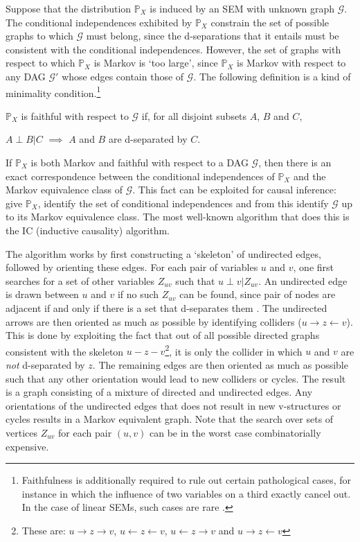 Suppose that the distribution $\mathbb{P}_X$ is induced by an SEM with unknown graph $\mathcal{G}$.
The conditional independences exhibited by $\mathbb{P}_X$ constrain the set of possible graphs to which $\mathcal{G}$ must belong, since the d-separations that it entails must be consistent with the conditional independences.
However, the set of graphs with respect to which $\mathbb{P}_X$ is Markov is `too large', since $\mathbb{P}_X$ is Markov with respect to any DAG $\mathcal{G}'$ whose edges contain those of $\mathcal{G}$.
The following definition is a kind of minimality condition.\footnote{Faithfulness is additionally required to rule out certain pathological cases, for instance in which the influence of two variables on a third exactly cancel out. In the case of linear SEMs, such cases are rare \cite{lauritzen, see elem causality book ex. 6.34}.}
\\

\begin{definition}[Faithfulness]\cite{cite something?}
$\mathbb{P}_X$ is faithful with respect to $\mathcal{G}$ if, for all disjoint subsets
$A$, $B$ and $C$, 
\begin{center}
$A \perp B | C$ $\implies$ $A$ and $B$ are d-separated by $C$.
\end{center}
\end{definition}
\medskip

If $\mathbb{P}_X$ is both Markov and faithful with respect to a DAG $\mathcal{G}$, then there is an exact correspondence between the conditional independences of $\mathbb{P}_X$ and the Markov equivalence class of $\mathcal{G}$. 
This fact can be exploited for causal inference: give $\mathbb{P}_X$, identify the set of conditional independences and from this identify $\mathcal{G}$ up to its Markov equivalence class.
The most well-known algorithm that does this is the IC (inductive causality) algorithm.

The algorithm works by first constructing a `skeleton' of undirected edges, followed by orienting these edges.
For each pair of variables $u$ and $v$, one first searches for a set of other variables $Z_{uv}$ such that $u \perp v| Z_{uv}$. 
An undirected edge is drawn between $u$ and $v$ if no such $Z_{uv}$ can be found, since pair of nodes are adjacent if and only if there is a set that d-separates them \cite{elem causality, lemma 7.8}. 
The undirected arrows are then oriented as much as possible by identifying colliders ($u \rightarrow z \leftarrow v$).
This is done by exploiting the fact that out of all possible directed graphs consistent with the skeleton $u - z- v $\footnote{These are: $u \rightarrow z \rightarrow v$, $u \leftarrow z \leftarrow v$, $u \leftarrow  z \rightarrow v$ and $u \rightarrow z \leftarrow v$}, it is only the collider in which $u$ and $v$ are \emph{not} d-separated by $z$.
The remaining edges are then oriented as much as possible such that any other orientation would lead to new colliders or cycles. 
The result is a graph consisting of a mixture of directed and undirected edges. Any orientations of the undirected edges that does not result in new v-structures or cycles results in a Markov equivalent graph.
Note that the search over sets of vertices $Z_{uv}$ for each pair $(u,v)$ can be in the worst case combinatorially expensive.

